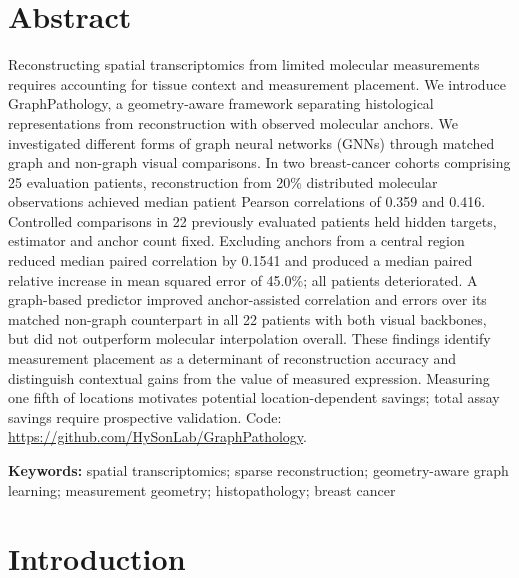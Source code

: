 
\begin{center}
{\Large\bfseries \PaperTitle\par}
\vspace{12 pt}
\AuthorNames\par
\vspace{5 pt}
\AuthorAffiliations\par
\vspace{5 pt}
\Correspondence\par
\end{center}
\vspace{8 pt}
\section*{Abstract}
Reconstructing spatial transcriptomics from limited molecular measurements requires accounting for tissue context and measurement placement. We introduce GraphPathology, a geometry-aware framework separating histological representations from reconstruction with observed molecular anchors. We investigated different forms of graph neural networks (GNNs) through matched graph and non-graph visual comparisons. In two breast-cancer cohorts comprising 25 evaluation patients, reconstruction from 20\% distributed molecular observations achieved median patient Pearson correlations of 0.359 and 0.416. Controlled comparisons in 22 previously evaluated patients held hidden targets, estimator and anchor count fixed. Excluding anchors from a central region reduced median paired correlation by 0.1541 and produced a median paired relative increase in mean squared error of 45.0\%; all patients deteriorated. A graph-based predictor improved anchor-assisted correlation and errors over its matched non-graph counterpart in all 22 patients with both visual backbones, but did not outperform molecular interpolation overall. These findings identify measurement placement as a determinant of reconstruction accuracy and distinguish contextual gains from the value of measured expression. Measuring one fifth of locations motivates potential location-dependent savings; total assay savings require prospective validation. Code: \url{https://github.com/HySonLab/GraphPathology}.

\noindent\textbf{Keywords:} spatial transcriptomics; sparse reconstruction; geometry-aware graph learning; measurement geometry; histopathology; breast cancer

\linenumbers

\section{Introduction}
\label{sec:introduction}

